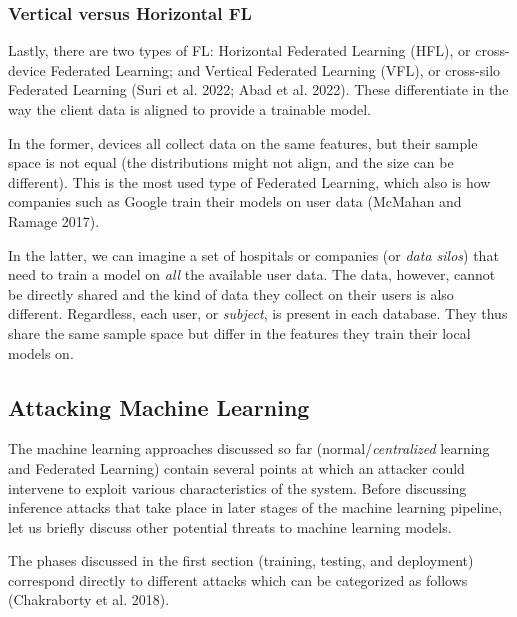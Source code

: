 \documentclass[
  compsoc]{IEEEtran}
\begin{document}
\hypertarget{vertical-versus-horizontal-fl}{%
\subsubsection{Vertical versus Horizontal
FL}\label{vertical-versus-horizontal-fl}}

Lastly, there are two types of FL: Horizontal Federated Learning (HFL),
or cross-device Federated Learning; and Vertical Federated Learning
(VFL), or cross-silo Federated Learning (Suri et al. 2022; Abad et al.
2022). These differentiate in the way the client data is aligned to
provide a trainable model.

In the former, devices all collect data on the same features, but their
sample space is not equal (the distributions might not align, and the
size can be different). This is the most used type of Federated
Learning, which also is how companies such as Google train their models
on user data (McMahan and Ramage 2017).

In the latter, we can imagine a set of hospitals or companies (or
\emph{data silos}) that need to train a model on \emph{all} the
available user data. The data, however, cannot be directly shared and
the kind of data they collect on their users is also different.
Regardless, each user, or \emph{subject}, is present in each database.
They thus share the same sample space but differ in the features they
train their local models on.

\hypertarget{attacking-machine-learning}{%
\subsection{Attacking Machine
Learning}\label{attacking-machine-learning}}

The machine learning approaches discussed so far
(normal/\emph{centralized} learning and Federated Learning) contain
several points at which an attacker could intervene to exploit various
characteristics of the system. Before discussing inference attacks that
take place in later stages of the machine learning pipeline, let us
briefly discuss other potential threats to machine learning models.

The phases discussed in the first section (training, testing, and
deployment) correspond directly to different attacks which can be
categorized as follows (Chakraborty et al. 2018).
\end{document}
